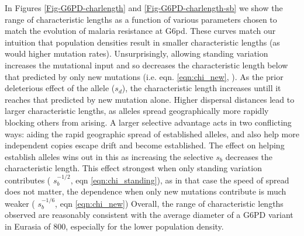 \documentclass{article}
\begin{document}



In Figures \ref{Fig-G6PD-charlength} and \ref{Fig-G6PD-charlength-sb} we show the range of characteristic lengths as a function 
of various parameters chosen to match the evolution of malaria
resistance at G6pd. 
These curves match our intuition that population densities result in
smaller characteristic lengths (as would higher mutation rates). 
Unsurprisingly, allowing standing variation increases the mutational
input and so decreases the characteristic length below that predicted
by only new mutations (i.e. eqn. \eqref{eqn:chi_new}, \citet{ralphcoop2010}).
As the prior deleterious effect of the allele ($s_d$), the
characteristic length increases untill it reaches that predicted by
new mutation alone. Higher dispersal distances lead to larger
characteristic lengths, as alleles spread geographically more rapidly blocking others
from arising. A larger selective advantage acts in two conflicting
ways: aiding the rapid geographic spread of established alleles, and also help more independent copies
escape drift and become established. The effect on helping establish
alleles wins out in this as increasing the selective $s_b$ decreases
the characteristic length. This effect strongest when only standing
variation contributes ( $s_b^{-1/2}$, eqn \eqref{eqn:chi_standing}), 
as in that case the speed of spread does not matter, the dependence
when only new mutations contribute is much weaker ( $s_b^{-1/6}$, eqn \eqref{eqn:chi_new})
Overall, the range of characteristic lengths observed are reasonably
consistent with the average diameter of a G6PD variant in Eurasia of
$800$, especially for the lower population density. 
\end{document}
